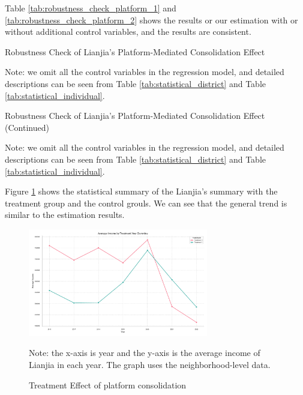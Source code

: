 \documentclass[11pt]{article}
\begin{document}
Table \ref{tab:robustness_check_platform_1} and \ref{tab:robustness_check_platform_2} shows the results or our estimation with or without additional control variables, and the results are consistent.

\begin{table}[H]
  \begin{center}
    \begin{scriptsize}
      \caption{Robustness Check of Lianjia's Platform-Mediated Consolidation Effect}
      \label{tab:robustness_check_platform_1}
      
    
    Note: we omit all the control variables in the regression model, and detailed descriptions can be seen from Table \ref{tab:statistical_district} and Table \ref{tab:statistical_individual}.
    \end{scriptsize}
  \end{center}
\end{table}

\begin{table}
  \begin{center}
    \begin{scriptsize}
      \caption{Robustness Check of Lianjia's Platform-Mediated Consolidation Effect (Continued)}
      \label{tab:robustness_check_platform_2}
      
    
    Note: we omit all the control variables in the regression model, and detailed descriptions can be seen from Table \ref{tab:statistical_district} and Table \ref{tab:statistical_individual}.
    \end{scriptsize}
  \end{center}
\end{table}

\clearpage

Figure \ref{fig:treatment_consolidation} shows the statistical summary of the Lianjia's summary with the treatment group and the control grouls. We can see that the general trend is similar to the estimation results.

\begin{figure}[H]
    \centering
    \includegraphics[width=0.7\textwidth]{../figures/average_income_by_treatment_platform.pdf}
    \caption{Treatment Effect of platform consolidation}
    \label{fig:treatment_consolidation}
    Note: the x-axis is year and the y-axis is the average income of Lianjia in each year. The graph uses the neighborhood-level data.
\end{figure}
\end{document}
